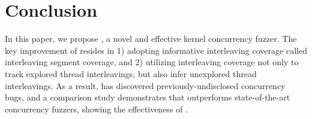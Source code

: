 \section{Conclusion}
\label{s:conclusion}




In this paper, we propose \sys, a novel and effective kernel
concurrency fuzzer.
%
The key improvement of \sys resides in 1) adopting informative
interleaving coverage called interleaving segment coverage, and 2)
utilizing interleaving coverage not only to track explored thread
interleavings, but also infer unexplored thread interleavings.
%
As a result, \sys has discovered \totalbugs previously-undisclosed
concurrency bugs, and a comparison study demonstrates that \sys
outperforms state-of-the-art concurrency fuzzers, showing the
effectiveness of \sys.




